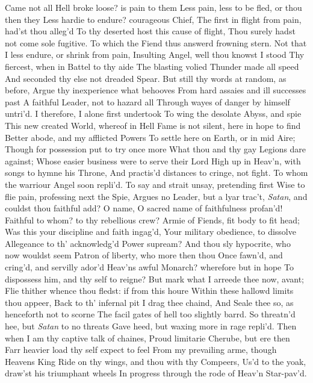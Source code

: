 \documentclass[11pt]{book}
\newcounter {first}
\newcounter {last}
\begin{document}
Came not all Hell broke loose? is pain to them 
Less pain, less to be fled, or thou then they 
Less hardie to endure? courageous Chief, 
The first in flight from pain, had'st thou alleg'd 
To thy deserted host this cause of flight, 
Thou surely hadst not come sole fugitive. 
\quad To which the Fiend thus answerd frowning stern. 
Not that I less endure, or shrink from pain, 
Insulting Angel, well thou knowst I stood 
Thy fiercest, when in Battel to thy aide 
The blasting volied Thunder made all speed 
And seconded thy else not dreaded Spear. 
But still thy words at random, as before, 
Argue thy inexperience what behooves 
From hard assaies and ill successes past 
A faithful Leader, not to hazard all 
Through wayes of danger by himself untri'd. 
I therefore, I alone first undertook 
To wing the desolate Abyss, and spie 
This new created World, whereof in Hell 
Fame is not silent, here in hope to find 
Better abode, and my afflicted Powers 
To settle here on Earth, or in mid Aire; 
Though for possession put to try once more 
What thou and thy gay Legions dare against; 
Whose easier business were to serve their Lord 
High up in Heav'n, with songs to hymne his Throne, 
And practis'd distances to cringe, not fight. 
\quad To whom the warriour Angel soon repli'd. 
To say and strait unsay, pretending first 
Wise to flie pain, professing next the Spie, 
Argues no Leader, but a lyar trac't, 
\textit{Satan}, and couldst thou faithful add?  O name, 
O sacred name of faithfulness profan'd! 
Faithful to whom? to thy rebellious crew? 
Armie of Fiends, fit body to fit head; 
Was this your discipline and faith ingag'd, 
Your military obedience, to dissolve 
Allegeance to th' acknowledg'd Power supream? 
And thou sly hypocrite, who now wouldst seem 
Patron of liberty, who more then thou 
Once fawn'd, and cring'd, and servilly ador'd 
Heav'ns awful Monarch? wherefore but in hope 
To dispossess him, and thy self to reigne? 
But mark what I arreede thee now, avant; 
Flie thither whence thou fledst: if from this houre 
Within these hallowd limits thou appeer, 
Back to th' infernal pit I drag thee chaind, 
And Seale thee so, as henceforth not to scorne 
The facil gates of hell too slightly barrd. 
\quad So threatn'd hee, but \textit{Satan} to no threats 
Gave heed, but waxing more in rage repli'd. 
\quad Then when I am thy captive talk of chaines, 
Proud limitarie Cherube, but ere then 
Farr heavier load thy self expect to feel 
From my prevailing arme, though Heavens King 
Ride on thy wings, and thou with thy Compeers, 
Us'd to the yoak, draw'st his triumphant wheels 
In progress through the rode of Heav'n Star-pav'd. 
\end{document}
